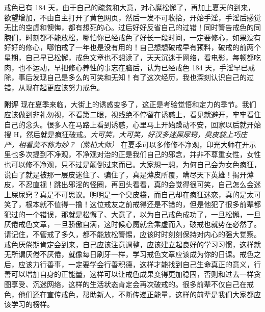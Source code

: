 \begin{case}
    戒色已有 184 天，由于自己的疏忽和大意，对心魔松懈了，再加上夏天的到来，欲望增加，不由自主打开了黄色网页，然后一发不可收拾，开始手淫，手淫后感觉无比的空虚和懊悔，都有想死的心。过后好好反省自己的过错！同时警告戒色的同胞们，时刻都不能放松，哪怕你已经戒色了好长一段时间，一定要修心，如果没有好好的修心，哪怕戒了一年也是没有用的！自己想想破戒早有预料，破戒的前两个星期，自己早已松懈，戒色文章也不想读了，天天沉迷于网络，看电影，每顿都吃肉，也不运动，早把修心养性的事忘在脑后，认为已经戒色 184 天，手淫早已戒除，事后发现自己是多么的可笑和无知！有了这次经历，我也深刻认识自己的过错，从现在起更应该努力戒色。

    \textbf{附评} 现在夏季来临，大街上的诱惑变多了，这正是考验觉悟和定力的季节。我们应该做到非礼勿视，不看第二眼，视线绝不停留在诱惑上，看见就避开，牢牢看住自己的念头。很多人在马路上看到诱惑，心里马上开始躁动不安，回家以后就开始搜 H，然后就是疯狂破戒。\textit{大可笑，大可笑，好汉多迷屎尿窍，臭皮袋上巧庄严，相看莫不称为妙？（紫柏大师）} 在夏季可以多修修不净观，印光大师在开示里也多次提到不净观，不净观对治的正是我们自己的邪念，并非不尊重女性，女性也可以修不净观，只不过是颠倒过来而已。大家想一想，为何自己会为女色疯狂，说白了就是被那一层皮迷住了、骗住了，真是薄皮所覆，瞒尽天下英雄！揭开薄皮，不忍直视！跳出邪淫的怪圈，再回头看看，真的会觉得很可笑，自己怎么会迷上屎尿窍？真是不可思议。明明是一个臭皮袋，而自己却在疯狂迷恋，真的是太可笑了，根本就不值得一撸！这位戒友之前戒得还是不错的，但是他犯了很多前辈都犯过的一个错误，那就是松懈了、大意了，以为自己戒色成功了，一旦松懈，一旦厌倦戒色文章，一旦骄傲自满，这时候心魔就会乘虚而入，破戒也就势在必然了。请记住，不管戒了多久，都不能放松警惕，应该时时刻刻保持对内心的强大觉察。戒色厌倦期肯定会到来，自己应该注意调整，应该建立起良好的学习习惯，这样就无所谓厌倦不厌倦，就像每日刷牙一样，学习戒色文章应该成为你的日课。戒色之后，应该力行善事，一定要学会行善积德，这样才能找到自己生命真正的意义，行善可以增加自身的正能量，这样可以让戒色成果变得更加稳固，否则和过去一样贪图享受、沉迷网络，这样的生活状态肯定会再次破戒的。很多前辈不仅自己在戒色，他们还在宣传戒色，帮助新人，不断传递正能量，这样的前辈是我们大家都应该学习的榜样。
\end{case}

